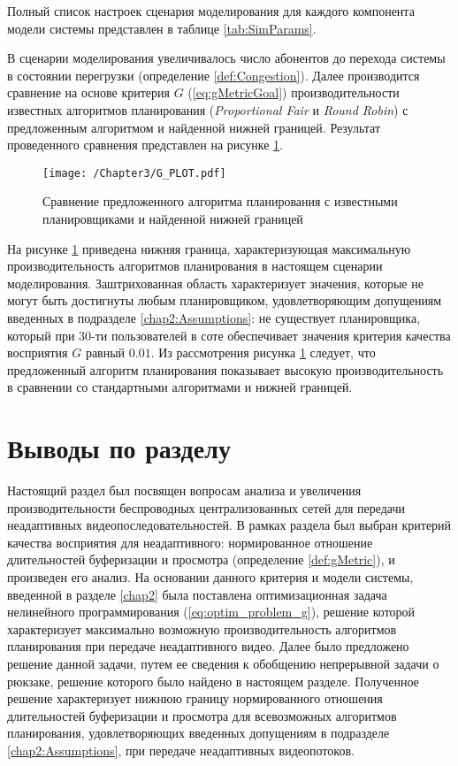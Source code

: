 Полный список настроек сценария моделирования для каждого компонента модели системы представлен в таблице \ref{tab:SimParams}.

В сценарии моделирования увеличивалось число абонентов до перехода системы в состоянии перегрузки (определение \ref{def:Congestion}). Далее производится сравнение на основе критерия $G$ (\ref{eq:gMetricGoal}) производительности известных алгоритмов планирования (\textit{Proportional Fair} и \textit{Round Robin}) с предложенным алгоритмом и найденной нижней границей. Результат проведенного сравнения представлен на рисунке \ref{fig:G_PLOT}.

\begin{figure}[htbp]
\begin{center}
\texttt{[image: /Chapter3/G\_PLOT.pdf]}
\caption{Сравнение предложенного алгоритма планирования с известными планировщиками и найденной нижней границей}
\label{fig:G_PLOT}
\end{center}
\end{figure}

На рисунке \ref{fig:G_PLOT} приведена нижняя граница, характеризующая максимальную производительность алгоритмов планирования в настоящем сценарии моделирования. Заштрихованная область характеризует значения, которые не могут быть достигнуты любым планировщиком, удовлетворяющим допущениям введенных в подразделе \ref{chap2:Assumptions}: не существует планировщика, который при 30-ти пользователей в соте обеспечивает значения критерия качества восприятия $G$ равный $0.01$. Из рассмотрения рисунка \ref{fig:G_PLOT} следует, что предложенный алгоритм планирования показывает высокую производительность в сравнении со стандартными алгоритмами и нижней границей.

\section{Выводы по разделу}

Настоящий раздел был посвящен вопросам анализа и увеличения производительности беспроводных централизованных сетей для передачи неадаптивных видеопоследовательностей. В рамках раздела был выбран критерий качества восприятия для неадаптивного: нормированное отношение длительностей буферизации и просмотра (определение \ref{def:gMetric}), и произведен его анализ. На основании данного критерия и модели системы, введенной в разделе \ref{chap2} была поставлена оптимизационная задача нелинейного программирования (\ref{eq:optim_problem_g}), решение которой характеризует максимально возможную производительность алгоритмов планирования при передаче неадаптивного видео. Далее было предложено решение данной задачи, путем ее сведения к обобщению непрерывной задачи о рюкзаке, решение которого было найдено в настоящем разделе. Полученное решение характеризует нижнюю границу нормированного отношения длительностей буферизации и просмотра для всевозможных алгоритмов планирования, удовлетворяющих введенных допущениям в подразделе \ref{chap2:Assumptions}, при передаче неадаптивных видеопотоков.

